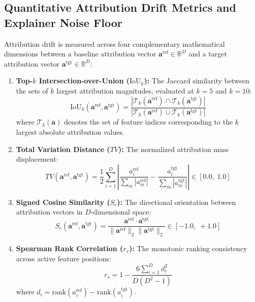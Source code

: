 \documentclass[conference]{IEEEtran}
\begin{document}
\subsection{Quantitative Attribution Drift Metrics and Explainer Noise Floor}
\label{sec:drift_metrics}
Attribution drift is measured across four complementary mathematical dimensions between a baseline attribution vector $\mathbf{a}^{\text{ref}} \in \mathbb{R}^D$ and a target attribution vector $\mathbf{a}^{\text{tgt}} \in \mathbb{R}^D$:
\begin{enumerate}
    \item \textbf{Top-$k$ Intersection-over-Union ($\text{IoU}_k$):} The Jaccard similarity between the sets of $k$ largest attribution magnitudes, evaluated at $k = 5$ and $k = 10$:
    \begin{equation}
    \text{IoU}_k(\mathbf{a}^{\text{ref}}, \mathbf{a}^{\text{tgt}}) = \frac{|\mathcal{T}_k(\mathbf{a}^{\text{ref}}) \cap \mathcal{T}_k(\mathbf{a}^{\text{tgt}})|}{|\mathcal{T}_k(\mathbf{a}^{\text{ref}}) \cup \mathcal{T}_k(\mathbf{a}^{\text{tgt}})|}
    \label{eq:iou_k}
    \end{equation}
    where $\mathcal{T}_k(\mathbf{a})$ denotes the set of feature indices corresponding to the $k$ largest absolute attribution values.
    \item \textbf{Total Variation Distance ($TV$):} The normalized attribution mass displacement:
    \begin{equation}
    TV(\mathbf{a}^{\text{ref}}, \mathbf{a}^{\text{tgt}}) = \frac{1}{2} \sum_{i=1}^D \left| \frac{a_i^{\text{ref}}}{\sum_m |a_m^{\text{ref}}|} - \frac{a_i^{\text{tgt}}}{\sum_m |a_m^{\text{tgt}}|} \right| \in [0.0, \; 1.0]
    \label{eq:tv}
    \end{equation}
    \item \textbf{Signed Cosine Similarity ($S_c$):} The directional orientation between attribution vectors in $D$-dimensional space:
    \begin{equation}
    S_c(\mathbf{a}^{\text{ref}}, \mathbf{a}^{\text{tgt}}) = \frac{\mathbf{a}^{\text{ref}} \cdot \mathbf{a}^{\text{tgt}}}{\|\mathbf{a}^{\text{ref}}\|_2 \|\mathbf{a}^{\text{tgt}}\|_2} \in [-1.0, \; +1.0]
    \label{eq:cosine}
    \end{equation}
    \item \textbf{Spearman Rank Correlation ($r_s$):} The monotonic ranking consistency across active feature positions:
    \begin{equation}
    r_s = 1 - \frac{6 \sum_{i=1}^D d_i^2}{D(D^2 - 1)}
    \label{eq:spearman}
    \end{equation}
    where $d_i = \text{rank}(a_i^{\text{ref}}) - \text{rank}(a_i^{\text{tgt}})$.
\end{enumerate}
\end{document}
